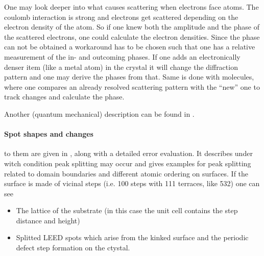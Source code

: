 One may look deeper into what causes scattering when electrons face atoms. The coulomb interaction is strong and electrons get scattered depending on the electron density of the atom. So if one knew both the amplitude and the phase of the scattered electrons, one could calculate the electron densities. Since the phase can not be obtained a workaround has to be chosen such that one has a relative measurement of the in- and outcoming phases. If one adds an electronically denser item (like a metal atom) in the crystal it will change the diffraction pattern and one may derive the phases from that. Same is done with molecules, where one compares an already resolved scattering pattern with the ``new'' one to track changes and calculate the phase.

Another (quantum mechanical) description can be found in \cite[341]{liuksiutov_two-dimensional_1992}.

\paragraph{Spot shapes and changes} to them are given in \cite[36]{woodruff_modern_1986}, along with a detailed error evaluation. It describes under witch condition peak splitting may occur and gives examples for peak splitting related to domain boundaries and different atomic ordering on surfaces. If the surface is made of vicinal steps (i.e. 100 steps with 111 terraces, like 532) one can see 
\begin{itemize}
 \item The lattice of the substrate (in this case the unit cell contains the step distance and height)
 \item Splitted LEED spots which arise from the kinked surface and the periodic defect step formation on the ctystal\cite[37ff]{riemann_ionic_2002}.
\end{itemize}

